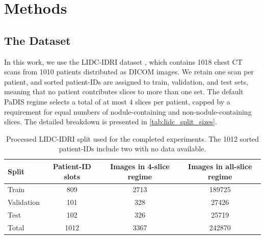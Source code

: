 \ifpdf
    \graphicspath{{Sections/3_methods_figs/Raster/}{Sections/3_methods_figs/PDF/}{Sections/3_methods_figs/}}
\else
    \graphicspath{{Sections/3_methods_figs/Vector/}{Sections/3_methods_figs/}}
\fi

\chapter{Methods}
\label{sec:method}

\section{The Dataset}
In this work, we use the LIDC-IDRI dataset \cite{armato_iii_data_2015-1,armato_lung_2011}, which contains 1018 chest CT scans from 1010 patients distributed as DICOM images. We retain one scan per patient, and sorted patient-IDs are assigned to train, validation, and test sets, meaning that no patient contributes slices to more than one set. The default PaDIS regime selects a total of at most $4$ slices per patient, capped by a requirement for equal numbers of nodule-containing and non-nodule-containing slices. The detailed breakdown is presented in \autoref{tab:lidc_split_sizes}.

\begin{table}[ht] 
    \centering 
    \begin{tabular}{lccc} 
        \hline \textbf{Split} & \textbf{Patient-ID slots} & \textbf{Images in 4-slice regime} & \textbf{Images in all-slice regime} \\
        \hline 
        Train & 809 & 2713 & 189725 \\ 
        Validation & 101 & 328 & 27426 \\ 
        Test & 102 & 326 & 25719 \\ 
        \hline Total & 1012 & 3367 & 242870 \\ 
        \hline 
    \end{tabular}
    \caption[Processed LIDC-IDRI split sizes.]{Processed LIDC-IDRI split used for the completed experiments. The 1012 sorted patient-IDs include two with no data available.}
    \label{tab:lidc_split_sizes} 
\end{table}

